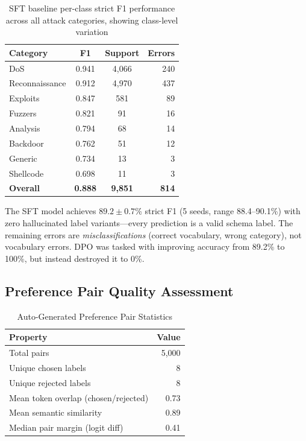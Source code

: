 \documentclass[journal]{IEEEtran}
\begin{document}
\begin{table}[!ht]
\centering\caption{SFT baseline per-class strict F1 performance across all attack categories, showing class-level variation}
\label{tab:sft}
\begin{tabular}{lccr}
\toprule
\textbf{Category} & \textbf{F1} & \textbf{Support} & \textbf{Errors} \\
\midrule
DoS & 0.941 & 4,066 & 240 \\
Reconnaissance & 0.912 & 4,970 & 437 \\
Exploits & 0.847 & 581 & 89 \\
Fuzzers & 0.821 & 91 & 16 \\
Analysis & 0.794 & 68 & 14 \\
Backdoor & 0.762 & 51 & 12 \\
Generic & 0.734 & 13 & 3 \\
Shellcode & 0.698 & 11 & 3 \\
\midrule
\textbf{Overall} & \textbf{0.888} & \textbf{9,851} & \textbf{814} \\
\bottomrule
\end{tabular}
\end{table}

The SFT model achieves $89.2 \pm 0.7$\% strict F1 (5 seeds, range 88.4--90.1\%) with zero hallucinated label variants---every prediction is a valid schema label. The remaining errors are \emph{misclassifications} (correct vocabulary, wrong category), not vocabulary errors. DPO was tasked with improving accuracy from 89.2\% to 100\%, but instead destroyed it to 0\%.

\subsection{Preference Pair Quality Assessment}

\begin{table}[!ht]
\centering\caption{Auto-Generated Preference Pair Statistics}
\label{tab:prefs}
\begin{tabular}{lr}
\toprule
\textbf{Property} & \textbf{Value} \\
\midrule
Total pairs & 5,000 \\
Unique chosen labels & 8 \\
Unique rejected labels & 8 \\
Mean token overlap (chosen/rejected) & 0.73 \\
Mean semantic similarity & 0.89 \\
Median pair margin (logit diff) & 0.41 \\
\bottomrule
\end{tabular}
\end{table}
\end{document}

